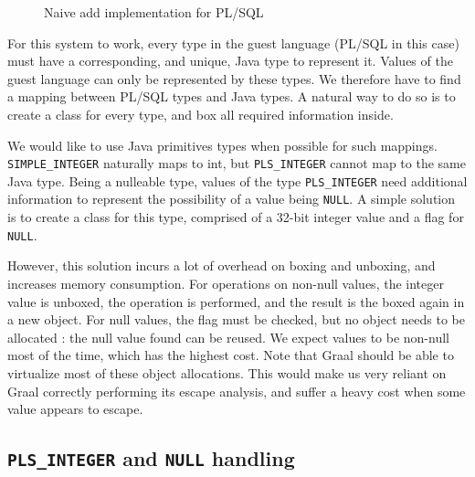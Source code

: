 \documentclass[twoside,11pt,a4paper]{article}
\newcommand{\java}[1]{\textsf{#1}}
\newcommand{\pls}[1]{\small\texttt{#1}\normalsize}
\newcommand{\plstype}[1]{\pls{#1}}
\newcommand{\plsi}{\plstype{PLS\_INTEGER}}
\newcommand{\simpleint}{\plstype{SIMPLE\_INTEGER}}
\newcommand{\plsnull}{\pls{NULL}}
\begin{document}
\begin{figure}[t]
	
	\caption{Naive add implementation for PL/SQL}
	\label{fig:naiveadd}
\end{figure}

For this system to work, every type in the guest language (PL/SQL in this case) must have a corresponding, and unique, Java type to represent it. Values of the guest language can only be represented by these types. We therefore have to find a mapping between PL/SQL types and Java types. A natural way to do so is to create a class for every type, and box all required information inside.

We would like to use Java primitives types when possible for such mappings. \simpleint{} naturally maps to \java{int}, but \plsi{} cannot map to the same Java type. Being a nulleable type, values of the type \plsi{} need additional information to represent the possibility of a value being \plsnull{}. A simple solution is to create a class for this type, comprised of a 32-bit integer value and a flag for \plsnull{}.

However, this solution incurs a lot of overhead on boxing and unboxing, and increases memory consumption. For operations on non-null values, the integer value is unboxed, the operation is performed, and the result is the boxed again in a new object. For null values, the flag must be checked, but no object needs to be allocated : the null value found can be reused. We expect values to be non-null most of the time, which has the highest cost. Note that Graal should be able to virtualize most of these object allocations. This would make us very reliant on Graal correctly performing its escape analysis, and suffer a heavy cost when some value appears to escape.

\subsection{\plsi{} and \plsnull{} handling}
\end{document}

